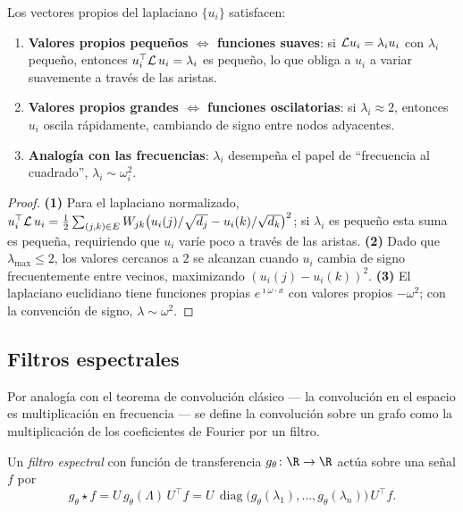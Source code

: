 \begin{theorem}
\label{thm:graphs:frequency}
Los vectores propios del laplaciano $\{u_i\}$ satisfacen:
\begin{enumerate}
  \item \textbf{Valores propios peque\~nos $\Leftrightarrow$ funciones suaves}: si
        $\mathcal{L} u_i = \lambda_i u_i$ con $\lambda_i$ peque\~no, entonces
        $u_i^\top \mathcal{L}\, u_i = \lambda_i$ es peque\~no, lo que obliga a $u_i$ a
        variar suavemente a trav\'es de las aristas.
  \item \textbf{Valores propios grandes $\Leftrightarrow$ funciones
        oscilatorias}: si $\lambda_i \approx 2$, entonces $u_i$ oscila
        r\'apidamente, cambiando de signo entre nodos adyacentes.
  \item \textbf{Analog\'ia con las frecuencias}: $\lambda_i$ desempe\~na el papel
        de ``frecuencia al cuadrado'', $\lambda_i \sim \omega_i^2$.
\end{enumerate}
\end{theorem}

\begin{proof}
\textbf{(1)} Para el laplaciano normalizado,
$u_i^\top \mathcal{L}\, u_i = \tfrac12 \sum_{(j,k)\in E} W_{jk}
\big(u_i(j)/\sqrt{d_j} - u_i(k)/\sqrt{d_k}\big)^2$; si $\lambda_i$ es peque\~no
esta suma es peque\~na, requiriendo que $u_i$ var\'ie poco a trav\'es de las
aristas. \textbf{(2)} Dado que $\lambda_{\max} \le 2$, los valores cercanos a $2$
se alcanzan cuando $u_i$ cambia de signo frecuentemente entre vecinos,
maximizando $(u_i(j) - u_i(k))^2$. \textbf{(3)} El laplaciano euclidiano tiene
funciones propias $e^{\imath \omega \cdot x}$ con valores propios $-\omega^2$;
con la convenci\'on de signo, $\lambda \sim \omega^2$.
\end{proof}

\subsection{Filtros espectrales}
\label{sec:graphs:filters}

Por analog\'ia con el teorema de convoluci\'on cl\'asico --- la convoluci\'on en
el espacio es multiplicaci\'on en frecuencia --- se define la convoluci\'on sobre
un grafo como la multiplicaci\'on de los coeficientes de Fourier por un filtro.

\begin{definition}
\label{def:graphs:spectral-filter}
Un \emph{filtro espectral} con funci\'on de transferencia
$g_\theta \colon \R \to \R$ act\'ua sobre una se\~nal $f$ por
\[
  g_\theta \star f
    = U\, g_\theta(\Lambda)\, U^\top f
    = U\, \operatorname{diag}\!\big(g_\theta(\lambda_1), \dots, g_\theta(\lambda_n)\big)\, U^\top f .
\]
\end{definition}

